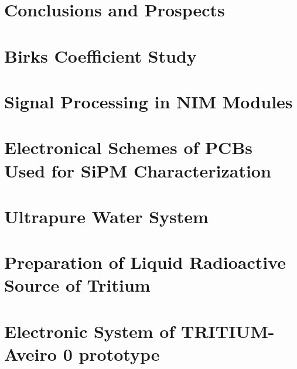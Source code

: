 \documentclass[12pt,a4paper]{book}
\begin{document}
\chapter{Conclusions and Prospects}  \label{chap:Conclusions}

\newpage


\appendix
\appendixpage
\noappendicestocpagenum
\addappheadtotoc

\chapter{Birks Coefficient Study}\label{App:BirksA}


\chapter{Signal Processing in NIM Modules}\label{App:ElectronicModulesNIM}


\chapter{Electronical Schemes of PCBs Used for SiPM Characterization}\label{App:ElectronicalSchemesSiPMPCBs}


\chapter{Ultrapure Water System}\label{App:UltraPureWaterSystem}


\chapter{Preparation of Liquid Radioactive Source of Tritium}\label{App:TritiumSourcePreparation}


\chapter{Electronic System of TRITIUM-Aveiro 0 prototype}\label{App:ElectronicSystemAveiro}



\end{document}
